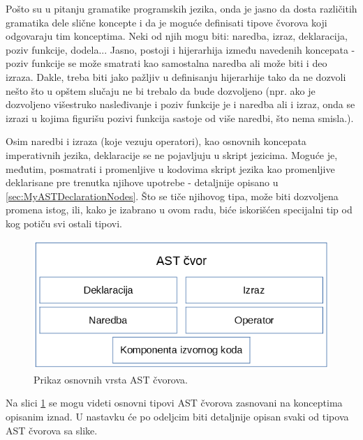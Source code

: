 Pošto su u pitanju gramatike programskih jezika, onda je jasno da dosta različitih gramatika dele slične koncepte i da je moguće definisati tipove čvorova koji odgovaraju tim konceptima. Neki od njih mogu biti: naredba, izraz, deklaracija, poziv funkcije, dodela... Jasno, postoji i hijerarhija između navedenih koncepata - poziv funkcije se može smatrati kao samostalna naredba ali može biti i deo izraza. Dakle, treba biti jako pažljiv u definisanju hijerarhije tako da ne dozvoli nešto što u opštem slučaju ne bi trebalo da bude dozvoljeno (npr. ako je dozvoljeno višestruko nasleđivanje i poziv funkcije je i naredba ali i izraz, onda se izrazi u kojima figurišu pozivi funkcija sastoje od više naredbi, što nema smisla.).

Osim naredbi i izraza (koje vezuju operatori), kao osnovnih koncepata imperativnih jezika, deklaracije se ne pojavljuju u skript jezicima. Moguće je, međutim, posmatrati i promenljive u kodovima skript jezika kao promenljive deklarisane pre trenutka njihove upotrebe - detaljnije opisano u \ref{sec:MyASTDeclarationNodes}. Što se tiče njihovog tipa, može biti dozvoljena promena istog, ili, kako je izabrano u ovom radu, biće iskorišćen specijalni tip od kog potiču svi ostali tipovi.

\begin{figure}[h!]
    \centering
        \includegraphics[scale=0.7]{images/nodes.png}
    \caption{Prikaz osnovnih vrsta AST čvorova.}
    \label{fig:ASTNode}
\end{figure}

Na slici \ref{fig:ASTNode} se mogu videti osnovni tipovi AST čvorova zasnovani na konceptima opisanim iznad. U nastavku će po odeljcim biti detaljnije opisan svaki od tipova AST čvorova sa slike.






